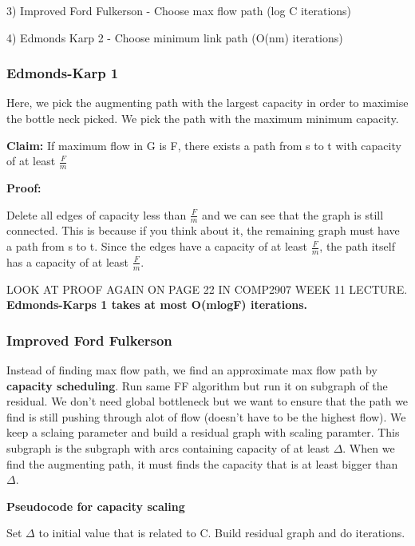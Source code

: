 \documentclass[11pt, oneside]{article}
\theoremstyle{definition}
\begin{document}
3) Improved Ford Fulkerson - Choose max flow path (log C iterations)

4) Edmonds Karp 2 - Choose minimum link path (O(nm) iterations)\\

\subsubsection{Edmonds-Karp 1}
Here, we pick the augmenting path with the largest capacity in order to maximise the bottle neck picked. We pick the path with the maximum minimum capacity.

\textbf{Claim:} If maximum flow in G is F, there exists a path from s to t with capacity of at least $\frac{F}{m}$

\textbf{Proof:}
\begin{addmargin}[1em]{2em}%

Delete all edges of capacity less than $\frac{F}{m}$ and we can see that the graph is still connected. This is because if you think about it, the remaining graph must have a path from s to t. Since the edges have a capacity of at least $\frac{F}{m}$, the path itself has a capacity of at least $\frac{F}{m}$.

\end{addmargin}

\begin{center}
  LOOK AT PROOF AGAIN ON PAGE 22 IN COMP2907 WEEK 11 LECTURE.
  \textbf{Edmonds-Karps 1 takes at most O(mlogF) iterations.}
\end{center}

\subsubsection{Improved Ford Fulkerson}
Instead of finding max flow path, we find an approximate max flow path by \textbf{capacity scheduling}. Run same FF algorithm but run it on subgraph of the residual. We don't need global bottleneck but we want to ensure that the path we find is still pushing through alot of flow (doesn't have to be the highest flow). We keep a sclaing parameter and build a residual graph with scaling paramter. This subgraph is the subgraph with arcs containing capacity of at least $\Delta$. When we find the augmenting path, it must finds the capacity that is at least bigger than $\Delta$.

\textbf{Pseudocode for capacity scaling}

Set $\Delta$ to initial value that is related to C. Build residual graph and do iterations.
\end{document}
